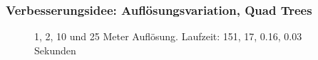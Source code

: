 \documentclass{beamer}
\begin{document}
\begin{frame}
  \frametitle{Verbesserungsidee: Auflösungsvariation, Quad Trees}
  \begin{figure}[h]
    \centering
    \caption{1, 2, 10 und 25 Meter Auflösung. \newline Laufzeit: 151, 17, 0.16, 0.03 Sekunden}
    \label{fig:resolutions}
  \end{figure}
\end{frame}
\end{document}
